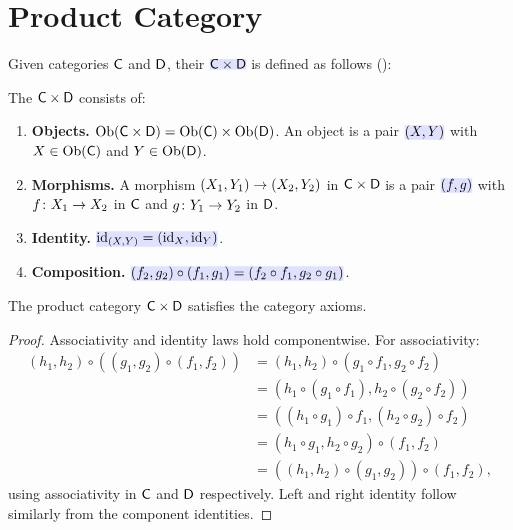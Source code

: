 \documentclass[../preamble]{subfiles}
\begin{document}
\section{Product Category}
\label{sec:product-category}

Given categories $\mathsf{C}$ and $\mathsf{D}$,
their 
$\newmath{\Category{C} \times \Category{D}}$
is defined as follows
():

\begin{definition}
  \label{def:product-category}
  The  $\mathsf{C} \times \mathsf{D}$
  consists of:
  \begin{enumerate}
    \item \textbf{Objects.}
      $\operatorname{Ob}(\mathsf{C} \times \mathsf{D})
        = \operatorname{Ob}(\mathsf{C}) \times \operatorname{Ob}(\mathsf{D})$.
      An object is a pair $\newmath{(X, Y)}$
      with $X \in \operatorname{Ob}(\mathsf{C})$ and $Y \in \operatorname{Ob}(\mathsf{D})$.

    \item \textbf{Morphisms.}
      A morphism $(X_1, Y_1) \lto (X_2, Y_2)$
      in $\mathsf{C} \times \mathsf{D}$
      is a pair $\newmath{(f, g)}$
      with $f \colon X_1 \lto X_2$ in $\mathsf{C}$
      and $g \colon Y_1 \lto Y_2$ in $\mathsf{D}$.

    \item \textbf{Identity.}
      $\newmath{\id_{(X,Y)} = (\id_X, \id_Y)}$.

    \item \textbf{Composition.}
      $\newmath{(f_2, g_2) \circ (f_1, g_1) = (f_2 \circ f_1, g_2 \circ g_1)}$.
  \end{enumerate}
\end{definition}

\begin{proposition}
  \label{prop:product-cat-laws}
  The product category $\mathsf{C} \times \mathsf{D}$
  satisfies the category axioms.
\end{proposition}

\begin{proof}
  Associativity and identity laws hold componentwise.
  For associativity:
  \begin{align*}
    (h_1, h_2) \circ ((g_1, g_2) \circ (f_1, f_2))
    &= (h_1, h_2) \circ (g_1 \circ f_1, g_2 \circ f_2) \\
    &= (h_1 \circ (g_1 \circ f_1), h_2 \circ (g_2 \circ f_2)) \\
    &= ((h_1 \circ g_1) \circ f_1, (h_2 \circ g_2) \circ f_2) \\
    &= (h_1 \circ g_1, h_2 \circ g_2) \circ (f_1, f_2) \\
    &= ((h_1, h_2) \circ (g_1, g_2)) \circ (f_1, f_2),
  \end{align*}
  using associativity in $\mathsf{C}$ and $\mathsf{D}$ respectively.
  Left and right identity follow similarly from the component identities.
\end{proof}
\end{document}

